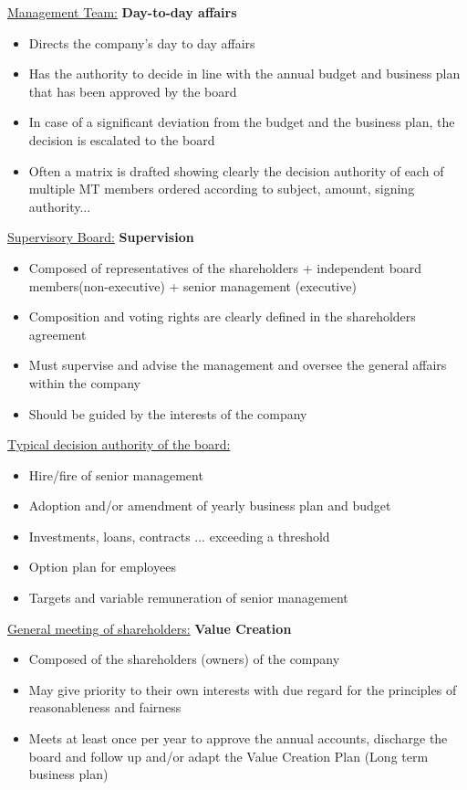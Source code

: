 \documentclass[8pt]{extreport}
\begin{document}
{\underline {Management Team:} \textbf{Day-to-day affairs}
\begin{itemize}
\item Directs the company's day to day affairs
\item Has the authority to decide in line with the annual budget and business plan that has been approved by the board
\item In case of a significant deviation from the budget and the business plan, the decision is escalated to the board
\item Often a matrix is drafted showing clearly the decision authority of each of multiple MT members ordered according to subject, amount, signing authority...
\end{itemize}
\underline {Supervisory Board:} \textbf{Supervision}
\begin{itemize}
\item Composed of representatives of the shareholders + independent board members(non-executive) + senior management (executive)
\item Composition and voting rights are clearly defined in the shareholders agreement
\item Must supervise and advise the management and oversee the general affairs within the company
\item Should be guided by the interests of the company
\end{itemize}
\underline{Typical decision authority of the board:}
\begin{itemize}
\item Hire/fire of senior management
\item Adoption and/or amendment of yearly business plan and budget
\item Investments, loans, contracts ... exceeding a threshold
\item Option plan for employees
\item Targets and variable remuneration of senior management
\end{itemize}
\underline{General meeting of shareholders:} \textbf{Value Creation}
\begin{itemize}
\item Composed of the shareholders (owners) of the company
\item May give priority to their own interests with due regard for the principles of reasonableness and fairness
\item Meets at least once per year to approve the annual accounts, discharge the board and follow up and/or adapt the Value Creation Plan (Long term business plan)

\end{itemize}}
\end{document}
